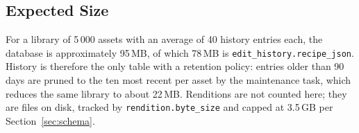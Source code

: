 \subsection{Expected Size}

For a library of 5\,000 assets with an average of 40 history entries each, the
database is approximately 95\,MB, of which 78\,MB is
\texttt{edit\_history.recipe\_json}. History is therefore the only table with a
retention policy: entries older than 90 days are pruned to the ten most recent
per asset by the maintenance task, which reduces the same library to about
22\,MB. Renditions are not counted here; they are files on disk, tracked by
\texttt{rendition.byte\_size} and capped at 3.5\,GB per Section~\ref{sec:schema}.
